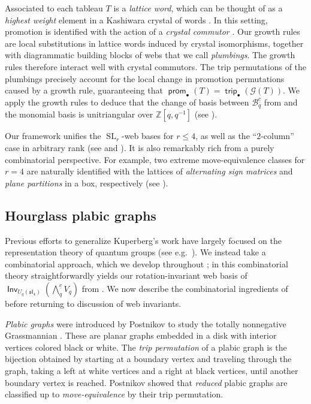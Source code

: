\documentclass{amsart}
\theoremstyle{definition}
\theoremstyle{remark}
\numberwithin{equation}{section}
\DeclareMathOperator{\trip}{\mathsf{trip}}
\DeclareMathOperator{\prom}{\mathsf{prom}}
\DeclareMathOperator{\SL}{SL}
\newcommand{\fsl}{\mathfrak{sl}}
\DeclareMathOperator{\Inv}{\mathsf{Inv}}
\begin{document}
\noindent Associated to each tableau $T$ is a \emph{lattice word}, which can be thought of as a \emph{highest weight} element in a Kashiwara crystal of words \cite{Bump-Schilling, Kashiwara-Crystals}. In this setting, promotion is identified with the action of a \emph{crystal commutor} \cite{henriques-kamnitzer, lenart, Pfannerer-Rubey-Westbury}. Our growth rules are local substitutions in lattice words induced by crystal isomorphisms, together with diagrammatic building blocks of webs that we call \emph{plumbings}. The growth rules therefore interact well with crystal commutors. The trip permutations of the plumbings precisely account for the local change in promotion permutations caused by a growth rule, guaranteeing that $\prom_{\bullet}(T)=\trip_{\bullet}(\mathcal{G}(T))$. We apply the growth rules to deduce that the change of basis between $\mathscr{B}_q^{\underline{c}}$ from  and the monomial basis is unitriangular over $\mathbb{Z}[q, q^{-1}]$ (see ).

Our framework unifies the $\SL_r$-web bases for $r \leq 4$, as well as the ``$2$-column'' case in arbitrary rank (see  and \cite{two-column}). It is also remarkably rich from a purely combinatorial perspective. For example, two extreme move-equivalence classes for $r=4$ are naturally identified with the lattices of \emph{alternating sign matrices} and \emph{plane partitions} in a box, respectively (see ). 

\subsection{Hourglass plabic graphs}\label{sec:thmB}

Previous efforts to generalize Kuperberg's work have largely focused on the representation theory of quantum groups (see e.g.~\cite{Kim,Morrison,Hagemeyer}). We instead take a combinatorial approach, which we develop throughout ; in  this combinatorial theory straightforwardly yields our rotation-invariant web basis of $\Inv_{U_q(\fsl_4)}(\bigwedge\nolimits_q^{\underline{c}} V_q)$ from . We now describe the combinatorial ingredients of  before returning to discussion of web invariants.

\emph{Plabic graphs} were introduced by Postnikov to study the totally nonnegative Grassmannian \cite{Postnikov-arxiv, Postnikov-ICM}. These are planar graphs embedded in a disk with interior vertices colored black or white. The \emph{trip permutation} of a plabic graph is the bijection obtained by starting at a boundary vertex and traveling through the graph, taking a left at white vertices and a right at black vertices, until another boundary vertex is reached. Postnikov showed that \emph{reduced} plabic graphs are classified up to \emph{move-equivalence} by their trip permutation.
\end{document}
